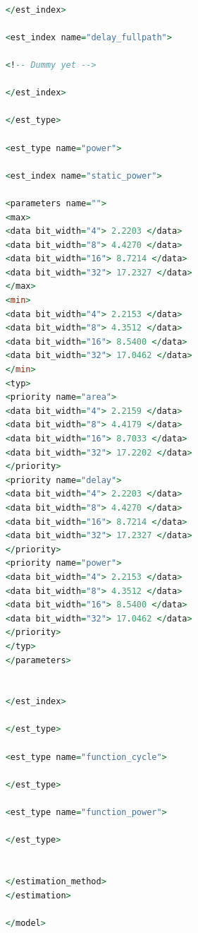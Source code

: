\begin{enumerate}[resume]
\begin{lstlisting}[language=vhdl,caption={"minmax.fhm"},captionpos=t]
	
	</est_index>
	
	<est_index name="delay_fullpath">
	
	<!-- Dummy yet -->
	
	</est_index>
	
	</est_type>
	
	<est_type name="power">
	
	<est_index name="static_power">
	
	<parameters name="">
	<max>
	<data bit_width="4"> 2.2203 </data>
	<data bit_width="8"> 4.4270 </data>
	<data bit_width="16"> 8.7214 </data>
	<data bit_width="32"> 17.2327 </data>
	</max>
	<min>
	<data bit_width="4"> 2.2153 </data>
	<data bit_width="8"> 4.3512 </data>
	<data bit_width="16"> 8.5400 </data>
	<data bit_width="32"> 17.0462 </data>
	</min>
	<typ>
	<priority name="area">
	<data bit_width="4"> 2.2159 </data>
	<data bit_width="8"> 4.4179 </data>
	<data bit_width="16"> 8.7033 </data>
	<data bit_width="32"> 17.2202 </data>
	</priority>
	<priority name="delay">
	<data bit_width="4"> 2.2203 </data>
	<data bit_width="8"> 4.4270 </data>
	<data bit_width="16"> 8.7214 </data>
	<data bit_width="32"> 17.2327 </data>
	</priority>
	<priority name="power">
	<data bit_width="4"> 2.2153 </data>
	<data bit_width="8"> 4.3512 </data>
	<data bit_width="16"> 8.5400 </data>
	<data bit_width="32"> 17.0462 </data>
	</priority>
	</typ>
	</parameters>
	
	
	</est_index>
	
	</est_type>
	
	<est_type name="function_cycle">
	
	</est_type>
	
	<est_type name="function_power">
	
	</est_type>
	
	
	</estimation_method>
	</estimation>
	
	</model>
	

\end{lstlisting}
\end{enumerate}
